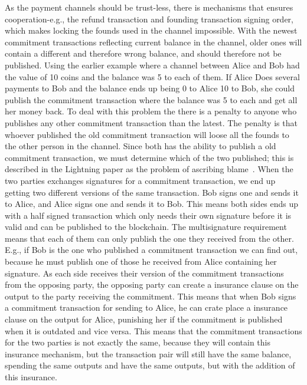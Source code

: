As the payment channels should be trust-less, there is mechanisms that ensures cooperation-e.g., the refund transaction and founding transaction signing order, which makes locking the founds used in the channel impossible. 
With the newest commitment transactions reflecting current balance in the channel, older ones will contain a different and therefore wrong balance, and should therefore not be published.
Using the earlier example where a channel between Alice and Bob had the value of 10 coins and the balance was 5 to each of them. If Alice Does several payments to Bob and the balance ends up being 0 to Alice 10 to Bob, she could publish the commitment transaction where the balance was 5 to each and get all her money back. To deal with this problem the there is a penalty to anyone who publishes any other commitment transaction than the latest. The penalty is that whoever published the old commitment transaction will loose all the founds to the other person in the channel.
Since both has the ability to publish a old commitment transaction, we must determine which of the two published; this is described in the Lightning paper as the problem of ascribing blame~\cite{poon2015bitcoin}. When the two parties exchanges signatures for a commitment transaction, 
we end up getting two different versions of the same transaction. Bob signs one and sends it to Alice, and Alice signs one and sends it to Bob. This means both sides ends up with a half signed transaction which only needs their own signature before it is valid and can be published to the blockchain. The multisignature requirement means that each of them can only publish the one they received from the other.
E.g., if Bob is the one who published a commitment transaction we can find out, because he must publish one of those he received from Alice containing her signature. As each side receives their version of the commitment transactions from the opposing party, the opposing party can create a insurance clause on the output to the party receiving the commitment. This means that when Bob signs a commitment transaction for sending to Alice, he can crate place a insurance clause on the output for Alice, punishing her if the commitment is published when it is outdated and vice versa.
This means that the commitment transactions for the two parties is not exactly the same, because they will contain this insurance mechanism, but the transaction pair will still have the same balance, spending the same outputs and have the same outputs, but with the addition of this insurance.
\\

